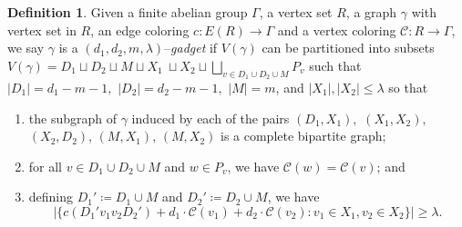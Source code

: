 \documentclass{article}
\newcommand{\cC}{\mathcal{C} }
\theoremstyle{definition}
\newtheorem{defn}[theorem]{Definition}
\begin{document}
\begin{defn} \label{def:gadgets}
    Given a finite abelian group $\Gamma$, a vertex set $R$, a graph $\gamma$ with vertex set in $R$, an edge coloring $c: E(R) \to \Gamma$ and a vertex coloring $\cC:R \to \Gamma$, we say $\gamma$ is a $(d_1,d_2,m,\lambda)$--\emph{gadget} if $V(\gamma)$ can be partitioned into subsets $V(\gamma)=D_1 \sqcup D_2 \sqcup M \sqcup X_1\ \sqcup X_2 \sqcup \bigsqcup_{v\in D_1 \cup D_2 \cup M} P_v$ such that $|D_1|=d_1-m-1,$ $|D_2|=d_2-m-1,$ $|M|=m$, and $|X_1|,|X_2|\leq \lambda$ so that
    
    \begin{enumerate}
        \item the subgraph of $\gamma$ induced by each of the pairs $(D_1,X_1),$ $(X_1,X_2),$ $(X_2,D_2)$, $(M,X_1)$, $(M,X_2)$ is a complete bipartite graph;
        \item for all $v\in D_1\cup D_2\cup M$ and $w\in P_v$, we have $\cC(w)=\cC(v)$; and
        \item defining $D_1'\coloneqq D_1\cup M$ and $D_2'\coloneqq  D_2\cup M$, we  have
        \begin{equation}\label{colorful}|\{c(D_1'v_1v_2D_2') +  d_1\cdot \cC(v_1) + d_2\cdot \cC(v_2):v_1\in X_1,v_2\in X_2\}|\geq \lambda.
    \end{equation}
    \end{enumerate}
\end{defn}
\end{document}
